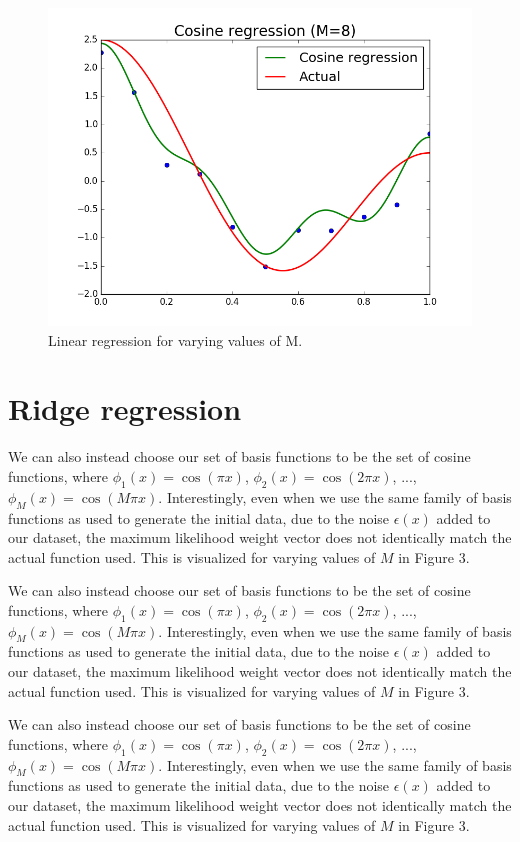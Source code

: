 \documentclass{article}
\begin{document}
\begin{figure}[width=\linewidth]
\begin{multicols}{2}
  \includegraphics[width=1.2\linewidth]{code/P2/cosine_regression,8.png}
\end{multicols}
\caption{Linear regression for varying values of M.}
\end{figure}

\section{Ridge regression}

We can also instead choose our set of basis functions to be the set of cosine functions, where $\phi_1(x) = \cos(\pi x)$, $\phi_2(x) = \cos(2 \pi x)$, ..., $\phi_M(x) = \cos(M \pi x)$. Interestingly, even when we use the same family of basis functions as used to generate the initial data, due to the noise $\epsilon(x)$ added to our dataset, the maximum likelihood weight vector does not identically match the actual function used. This is visualized for varying values of $M$ in Figure 3.

We can also instead choose our set of basis functions to be the set of cosine functions, where $\phi_1(x) = \cos(\pi x)$, $\phi_2(x) = \cos(2 \pi x)$, ..., $\phi_M(x) = \cos(M \pi x)$. Interestingly, even when we use the same family of basis functions as used to generate the initial data, due to the noise $\epsilon(x)$ added to our dataset, the maximum likelihood weight vector does not identically match the actual function used. This is visualized for varying values of $M$ in Figure 3.

We can also instead choose our set of basis functions to be the set of cosine functions, where $\phi_1(x) = \cos(\pi x)$, $\phi_2(x) = \cos(2 \pi x)$, ..., $\phi_M(x) = \cos(M \pi x)$. Interestingly, even when we use the same family of basis functions as used to generate the initial data, due to the noise $\epsilon(x)$ added to our dataset, the maximum likelihood weight vector does not identically match the actual function used. This is visualized for varying values of $M$ in Figure 3.
\end{document}

